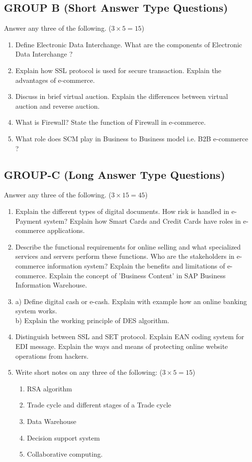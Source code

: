 \documentclass{article}
\begin{document}
\subsection*{GROUP B (Short Answer Type Questions)}
Answer any three of the following. ($3 \times 5 = 15$)
\begin{enumerate}
    \item[2.] Define Electronic Data Interchange. What are the components of Electronic Data Interchange ?
    \item[3.] Explain how SSL protocol is used for secure transaction. Explain the advantages of e-commerce.
    \item[4.] Discuss in brief virtual auction. Explain the differences between virtual auction and reverse auction.
    \item[5.] What is Firewall? State the function of Firewall in e-commerce.
    \item[6.] What role does SCM play in Business to Business model i.e. B2B e-commerce ?
\end{enumerate}

\subsection*{GROUP-C (Long Answer Type Questions)}
Answer any three of the following. ($3 \times 15 = 45$)
\begin{enumerate}
    \item[7.] Explain the different types of digital documents. How risk is handled in e-Payment system? Explain how Smart Cards and Credit Cards have roles in e-commerce applications.
    \item[8.] Describe the functional requirements for online selling and what specialized services and servers perform these functions. Who are the stakeholders in e-commerce information system? Explain the benefits and limitations of e-commerce. Explain the concept of 'Business Content' in SAP Business Information Warehouse.
    \item[9.] 
    a) Define digital cash or e-cash. Explain with example how an online banking system works. \\
    b) Explain the working principle of DES algorithm.
    \item[10.] Distinguish between SSL and SET protocol. Explain EAN coding system for EDI message. Explain the ways and means of protecting online website operations from hackers.
    \item[11.] Write short notes on any three of the following: ($3 \times 5 = 15$)
    \begin{enumerate}
        \item[a)] RSA algorithm
        \item[b)] Trade cycle and different stages of a Trade cycle
        \item[c)] Data Warehouse
        \item[d)] Decision support system
        \item[e)] Collaborative computing.
    \end{enumerate}
\end{enumerate}\newpage
\end{document}
